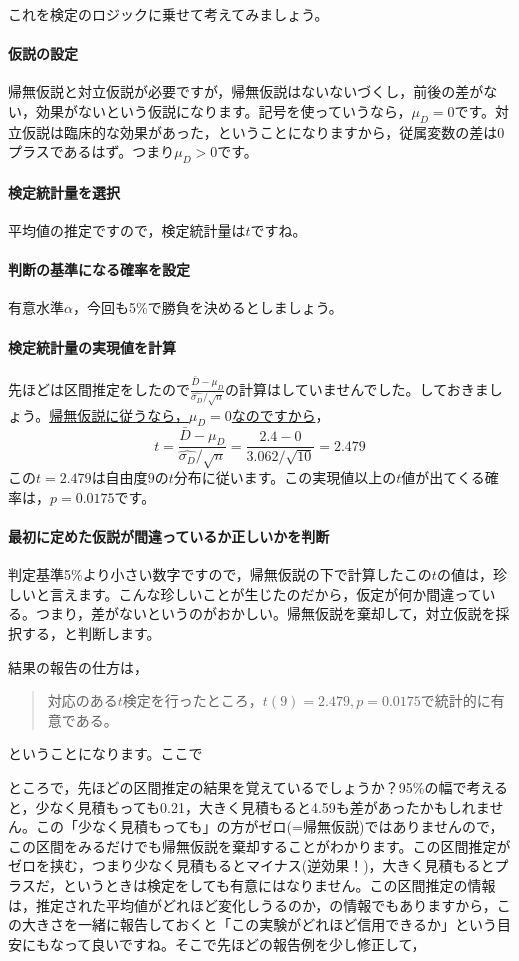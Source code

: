 \documentclass{ltjsarticle}
\begin{document}
これを検定のロジックに乗せて考えてみましょう。
\paragraph{仮説の設定}帰無仮説と対立仮説が必要ですが，帰無仮説はないないづくし，前後の差がない，効果がないという仮説になります。記号を使っていうなら，$\mu_D=0$です。対立仮説は臨床的な効果があった，ということになりますから，従属変数の差は0プラスであるはず。つまり$\mu_D > 0$です。
\paragraph{検定統計量を選択}平均値の推定ですので，検定統計量は$t$ですね。
\paragraph{判断の基準になる確率を設定}有意水準$\alpha$，今回も5\%で勝負を決めるとしましょう。
\paragraph{検定統計量の実現値を計算}先ほどは区間推定をしたので$\frac{\bar{D}-\mu_D}{\hat{\sigma_D}/\sqrt{n}} $の計算はしていませんでした。しておきましょう。\underline{帰無仮説に従うなら，$\mu_D=0$なのですから}，
$$t= \frac{\bar{D}-\mu_D}{\hat{\sigma_D}/\sqrt{n}}  = \frac{2.4-0}{3.062/\sqrt{10}}  = 2.479$$
この$t = 2.479$は自由度$9$の$t$分布に従います。この実現値以上の$t$値が出てくる確率は，$p=0.0175$です。
\paragraph{最初に定めた仮説が間違っているか正しいかを判断}
判定基準5\%より小さい数字ですので，帰無仮説の下で計算したこの$t$の値は，珍しいと言えます。こんな珍しいことが生じたのだから，仮定が何か間違っている。つまり，差がないというのがおかしい。帰無仮説を棄却して，対立仮説を採択する，と判断します。

結果の報告の仕方は，
\begin{quote}
    対応のある$t$検定を行ったところ，$t(9)=2.479,p=0.0175$で統計的に有意である。
\end{quote}
ということになります。ここで

ところで，先ほどの区間推定の結果を覚えているでしょうか？95\%の幅で考えると，少なく見積もっても0.21，大きく見積もると4.59も差があったかもしれません。この「少なく見積もっても」の方がゼロ(=帰無仮説)ではありませんので，この区間をみるだけでも帰無仮説を棄却することがわかります。この区間推定がゼロを挟む，つまり少なく見積もるとマイナス(逆効果！)，大きく見積もるとプラスだ，というときは検定をしても有意にはなりません。この区間推定の情報は，推定された平均値がどれほど変化しうるのか，の情報でもありますから，この大きさを一緒に報告しておくと「この実験がどれほど信用できるか」という目安にもなって良いですね。そこで先ほどの報告例を少し修正して，
\end{document}
